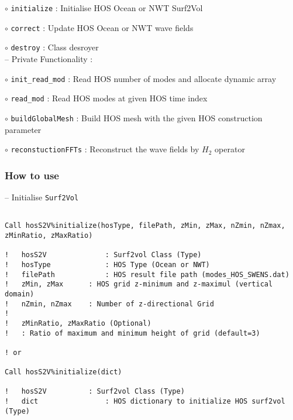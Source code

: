 \hspace{1.0 cm} $\circ$ \texttt{initialize} : Initialise HOS Ocean or NWT Surf2Vol

\hspace{1.0 cm} $\circ$ \texttt{correct} : Update HOS Ocean or NWT wave fields

\hspace{1.0 cm} $\circ$ \texttt{destroy} : Class desroyer\\

\hspace{0.5 cm} -- Private Functionality :

\hspace{1.0 cm} $\circ$ \texttt{init\_read\_mod} : Read HOS number of modes and allocate dynamic array

\hspace{1.0 cm} $\circ$ \texttt{read\_mod} : Read HOS modes at given HOS time index

\hspace{1.0 cm} $\circ$ \texttt{buildGlobalMesh} : Build HOS mesh with the given HOS construction parameter

\hspace{1.0 cm} $\circ$ \texttt{reconstuctionFFTs} : Reconstruct the wave fields by $H_2$ operator \\

\subsubsection{How to use}

\hspace{0.5 cm} -- Initialise \texttt{Surf2Vol}

\begin{lstlisting}[language={[95]Fortran}]

Call hosS2V%initialize(hosType, filePath, zMin, zMax, nZmin, nZmax, zMinRatio, zMaxRatio)

!	hosS2V				: Surf2vol Class (Type)
!	hosType				: HOS Type (Ocean or NWT)
!	filePath			: HOS result file path (modes_HOS_SWENS.dat)
!	zMin, zMax 		: HOS grid z-minimum and z-maximul (vertical domain)
!	nZmin, nZmax 	: Number of z-directional Grid	
!
!	zMinRatio, zMaxRatio (Optional)
!	: Ratio of maximum and minimum height of grid (default=3)

! or 

Call hosS2V%initialize(dict)

!	hosS2V			: Surf2vol Class (Type)
!	dict				: HOS dictionary to initialize HOS surf2vol (Type)
\end{lstlisting}		

